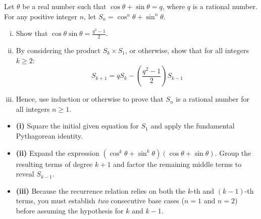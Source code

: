 \begin{problem}
Let $\theta$ be a real number such that $\cos \theta + \sin \theta = q$, where $q$ is a rational number. 
For any positive integer $n$, let $S_n = \cos^n \theta + \sin^n \theta$.

\begin{enumerate}[(i)]
    \item Show that $\cos \theta \sin \theta = \frac{q^2 - 1}{2}$.
    \item By considering the product $S_k \times S_1$, or otherwise, show that for all integers $k \ge 2$:
    \[ S_{k+1} = q S_k - \left(\frac{q^2 - 1}{2}\right)S_{k-1} \]
    \item Hence, use induction or otherwise to prove that $S_n$ is a rational number for all integers $n \ge 1$.
\end{enumerate}
\end{problem}

\begin{hintbox}
\begin{itemize}
    \item \textbf{(i)} Square the initial given equation for $S_1$ and apply the fundamental Pythagorean identity.
    \item \textbf{(ii)} Expand the expression $(\cos^k \theta + \sin^k \theta)(\cos \theta + \sin \theta)$. Group the resulting terms of degree $k+1$ and factor the remaining middle terms to reveal $S_{k-1}$.
    \item \textbf{(iii)} Because the recurrence relation relies on both the $k$-th and $(k-1)$-th terms, you must establish \textit{two} consecutive base cases ($n=1$ and $n=2$) before assuming the hypothesis for $k$ and $k-1$. 
\end{itemize}
\end{hintbox}

